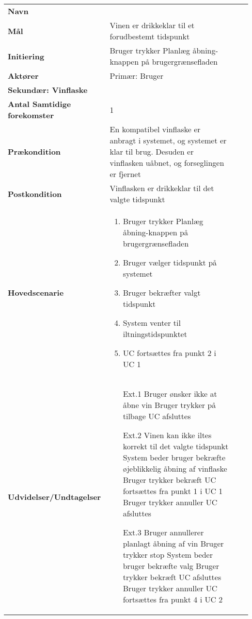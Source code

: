 \begin{longtable}{>{\bfseries}TX TX}
	
	Navn & \bfseries{} \\
	Mål & Vinen er drikkeklar til et forudbestemt tidspunkt\\
	Initiering & Bruger trykker Planlæg åbning-knappen på brugergrænsefladen\\
	Aktører & Primær: Bruger \\
	Sekundær: Vinflaske \\
	Antal Samtidige forekomster & 1 \\
	Prækondition & En kompatibel vinflaske er anbragt i systemet, og systemet er klar til brug. Desuden er vinflasken uåbnet, og forseglingen er fjernet \\
	Postkondition & Vinflasken er drikkeklar til det valgte tidspunkt\\
	Hovedscenarie & \begin{enumerate}
		\item Bruger trykker Planlæg åbning-knappen på brugergrænsefladen	
		\item Bruger vælger tidspunkt på systemet
		\item Bruger bekræfter valgt tidspunkt
		\item System venter til iltningstidspunktet
		\item UC fortsættes fra punkt 2 i UC 1	
	\end{enumerate} \\
	Udvidelser/Undtagelser & \begin{enumerate}
		\item[Ext.1] Bruger ønsker ikke at åbne vin
		\subitem[1.1] Bruger trykker på tilbage
		\subitem[1.2] UC afsluttes
		\item[Ext.2] Vinen kan ikke iltes korrekt til det valgte tidspunkt
		\subitem[2.1] System beder bruger bekræfte øjeblikkelig åbning af vinflaske
		\subitem[2.2a] Bruger trykker bekræft
		\subitem[2.3a] UC fortsættes fra punkt 1 i UC 1
		\subitem[2.2b] Bruger trykker annuller
		\subitem[2.3b] UC afsluttes
		\item[Ext.3] Bruger annullerer planlagt åbning af vin
		\subitem[3.1] Bruger trykker stop
		\subitem[3.2] System beder bruger bekræfte valg
		\subitem[3.3a] Bruger trykker bekræft
		\subitem[3.4a] UC afsluttes
		\subitem[3.3b] Bruger trykker annuller
		\subitem[3.4b] UC fortsættes fra punkt 4 i UC 2
	\end{enumerate}
\end{longtable}